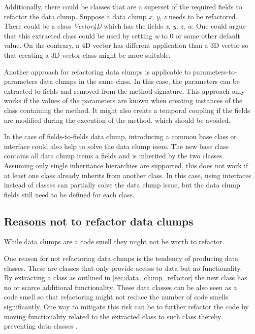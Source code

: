 Additionally, there could be classes that are a superset of the required fields to refactor the data clump. Suppose a data clump \textit{x}, \textit{y}, \textit{z} needs to be refactored. There could be a  class \textit{Vector4D} which has the fields  \textit{x}, \textit{y}, \textit{z}, \textit{w}. One could argue that this extracted class could be used by setting \textit{w} to 0 or some other default value. On the contrary, a 4D vector has different application than a 3D vector so that creating a 3D vector class might be more suitable. 

Another approach for refactoring data clumps is applicable to parameters-to-parameters data clumps in the same class. In this case, the parameters can be extracted to fields and removed from the method signature. This approach only works if the values of the parameters are known when creating instances of the class containing the method. It might also create a temporal  coupling if the fields are modified during the execution of the method, which should be avoided. 


In the case of fields-to-fields data clump, introducing a common base class or interface could also help to solve the data clump issue. The new base class contains all data clump items a fields and is inherited by the two classes. Assuming only single inheritance hierarchies are supported, this does not work if at least one class already inherits from another class. In this case, using interfaces instead of classes can partially solve the data clump issue, but the data clump fields still need to be defined for each class.





\subsection{Reasons not to refactor data clumps}\label{sec:data_clump_not_refactor}
While data clumps are a code smell they might not be worth to refactor. 

One reason for not refactoring data clumps is the tendency of producing data classes. These are classes that only provide access to data but no functionality. By extracting a class as outlined in \ref{sec:data_clump_refactor} the new class has no or scarce additional functionality. These data classes can be also seen as a code smell so that refactoring might not reduce the number of code smells significantly. One way to mitigate this risk can be to further refactor the code by moving functionality related to the extracted class to such class thereby preventing data classes \cite{fowler2019refactoring}. 

